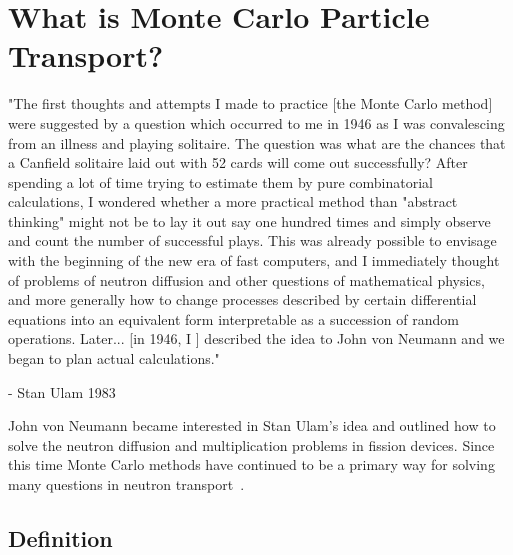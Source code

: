 \section{ \textbf{What is Monte Carlo Particle Transport?}}

\begin{displayquote}
"The first thoughts and attempts I made to practice [the Monte Carlo method] were suggested by a question which occurred to me in 1946 as I was convalescing from an illness and playing solitaire. The question was what are the chances that a Canfield solitaire laid out with 52 cards will come out successfully? After spending a lot of time trying to estimate them by pure combinatorial calculations, I wondered whether a more practical method than "abstract thinking" might not be to lay it out say one hundred times and simply observe and count the number of successful plays. This was already possible to envisage with the beginning of the new era of fast computers, and I immediately thought of problems of neutron diffusion and other questions of mathematical physics, and more generally how to change processes described by certain differential equations into an equivalent form interpretable as a succession of random operations. Later... [in 1946, I ] described the idea to John von Neumann and we began to plan actual calculations."
\end{displayquote}
\begin{displayquote}
- Stan Ulam 1983 ~\cite{theMCM}
\end{displayquote}

John von Neumann became interested in Stan Ulam's idea and outlined how to solve the neutron diffusion and multiplication problems in fission devices.
%
Since this time Monte Carlo methods have continued to be a primary way for solving many questions in neutron transport~\cite{theMCM}.
%

\subsection{ \textbf{ Definition} }

